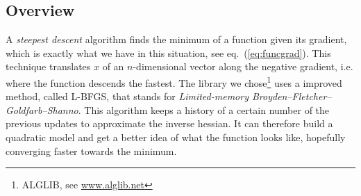 \documentclass[a4paper,12pt,twoside]{article}
\def \eq#1{eq.~(\ref{#1})}
\begin{document}
\subsection{Overview}
A {\em steepest descent} algorithm finds the minimum of a function given its gradient, which is exactly what we have in this situation, see \eq{eq:funcgrad}. 
This technique translates $x$ of an $n$-dimensional vector along the negative gradient, i.e. where the function descends the fastest.
The library we chose\footnote{ ALGLIB, see \url{www.alglib.net}} uses a  improved method, called L-BFGS, that stands for {\em Limited-memory  Broyden--Fletcher--Goldfarb--Shanno}.
This algorithm keeps a history of a certain number of the previous updates to approximate the inverse hessian.
It can therefore build a quadratic model and get a better idea of what the function looks like, hopefully converging faster towards the minimum.
\end{document}
